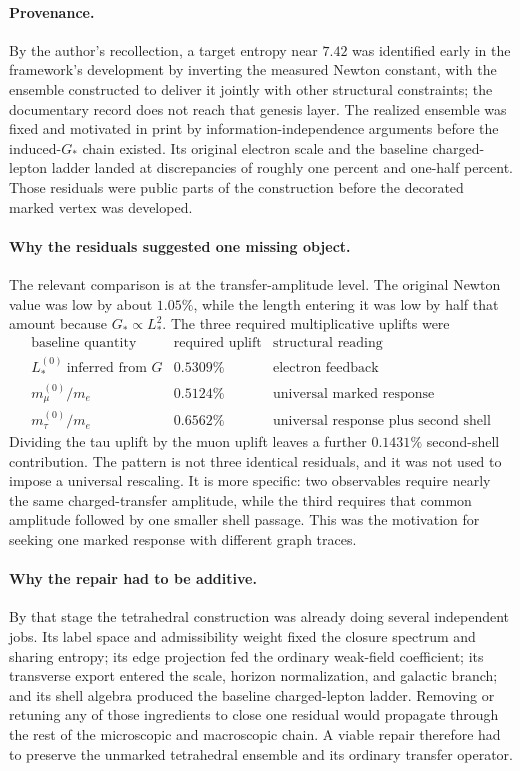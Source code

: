 \documentclass[11pt]{article}
\begin{document}
\paragraph{Provenance.} By the author's recollection, a target entropy near $7.42$ was identified early in the framework's development by inverting the measured Newton constant, with the ensemble constructed to deliver it jointly with other structural constraints; the documentary record does not reach that genesis layer. The realized ensemble was fixed and motivated in print by information-independence arguments before the induced-$G_*$ chain existed. Its original electron scale and the baseline charged-lepton ladder landed at discrepancies of roughly one percent and one-half percent. Those residuals were public parts of the construction before the decorated marked vertex was developed.

\paragraph{Why the residuals suggested one missing object.}
The relevant comparison is at the transfer-amplitude level. The original Newton value was low by about $1.05\%$, while the length entering it was low by half that amount because $G_*\propto L_*^2$. The three required multiplicative uplifts were
\[
\begin{array}{c|c|c}
\text{baseline quantity} & \text{required uplift} & \text{structural reading}\\
\hline
L_*^{(0)}\ \text{inferred from }G & 0.5309\% & \text{electron feedback}\\
m_\mu^{(0)}/m_e & 0.5124\% & \text{universal marked response}\\
m_\tau^{(0)}/m_e & 0.6562\% & \text{universal response plus second shell}
\end{array}
\]
Dividing the tau uplift by the muon uplift leaves a further $0.1431\%$ second-shell contribution. The pattern is not three identical residuals, and it was not used to impose a universal rescaling. It is more specific: two observables require nearly the same charged-transfer amplitude, while the third requires that common amplitude followed by one smaller shell passage. This was the motivation for seeking one marked response with different graph traces.

\paragraph{Why the repair had to be additive.}
By that stage the tetrahedral construction was already doing several independent jobs. Its label space and admissibility weight fixed the closure spectrum and sharing entropy; its edge projection fed the ordinary weak-field coefficient; its transverse export entered the scale, horizon normalization, and galactic branch; and its shell algebra produced the baseline charged-lepton ladder. Removing or retuning any of those ingredients to close one residual would propagate through the rest of the microscopic and macroscopic chain. A viable repair therefore had to preserve the unmarked tetrahedral ensemble and its ordinary transfer operator.
\end{document}
